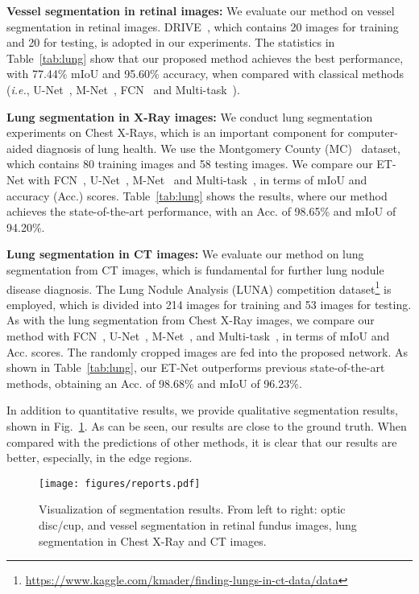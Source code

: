 \documentclass[runningheads,a4paper]{llncs}
\newcommand{\ie}{{\it i.e.}}
\begin{document}
\noindent\textbf{Vessel segmentation in retinal images:} We evaluate our method on vessel segmentation in retinal images. DRIVE~\cite{DRIVE}, which contains 20 images for training and 20 for testing, is adopted in our experiments. The statistics in Table~\ref{tab:lung} show that our proposed method achieves the best performance, with 77.44\% mIoU and 95.60\% accuracy, when compared with classical methods (\ie, U-Net~\cite{Ronneberger2015}, M-Net~\cite{mnet2018fu}, FCN~\cite{fcn} and Multi-task~\cite{multitask}).

\noindent\textbf{Lung segmentation in X-Ray images:} We conduct lung segmentation experiments on Chest X-Rays, which is an important component for computer-aided diagnosis of lung health. We use the Montgomery County (MC)~\cite{mc} dataset, which contains 80 training images and 58 testing images. We compare our ET-Net with FCN~\cite{fcn}, U-Net~\cite{Ronneberger2015}, M-Net~\cite{mnet2018fu} and Multi-task~\cite{multitask}, in terms of mIoU and accuracy (Acc.) scores. Table~\ref{tab:lung} shows the results, where our method achieves the state-of-the-art performance, with an Acc. of 98.65\% and mIoU of 94.20\%.

\noindent\textbf{Lung segmentation in CT images:} We evaluate our method on lung segmentation from CT images, which is fundamental for further lung nodule disease diagnosis. The Lung Nodule Analysis (LUNA) competition dataset\footnote{\href{https://www.kaggle.com/kmader/finding-lungs-in-ct-data/data}{https://www.kaggle.com/kmader/finding-lungs-in-ct-data/data}} is employed, which is divided into 214 images for training and 53 images for testing. As with the lung segmentation from Chest X-Ray images, we compare our method with FCN~\cite{fcn}, U-Net~\cite{Ronneberger2015}, M-Net~\cite{mnet2018fu}, and Multi-task~\cite{multitask}, in terms of mIoU and Acc. scores. The randomly cropped images are fed into the proposed network. As shown in Table~\ref{tab:lung}, our ET-Net outperforms previous state-of-the-art methods, obtaining an Acc. of 98.68\% and mIoU of 96.23\%.



In addition to quantitative results, we provide qualitative segmentation results, shown in Fig.~\ref{fig:reports}. As can be seen, our results are close to the ground truth. When compared with the predictions of other methods, it is clear that our results are better, especially, in the edge regions.

\begin{figure}[!t]
\centering
\texttt{[image: figures/reports.pdf]}
\caption{Visualization of segmentation results. From left to right: optic disc/cup, and vessel segmentation in retinal fundus images, lung segmentation in Chest X-Ray and CT images.}
\label{fig:reports}
\end{figure}
\end{document}
